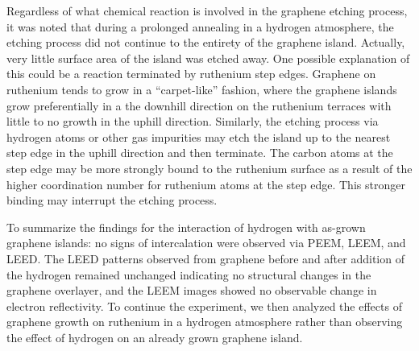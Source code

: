 Regardless of what chemical reaction is involved in the graphene etching process, it was noted that during a prolonged annealing in a hydrogen atmosphere, the etching process did not continue to the entirety of the graphene island. Actually, very little surface area of the island was etched away. One possible explanation of this could be a reaction terminated by ruthenium step edges.  Graphene on ruthenium tends to grow in a ``carpet-like'' fashion, where the graphene islands grow preferentially in a the downhill direction on the ruthenium terraces with little to no growth in the uphill direction. Similarly, the etching process via hydrogen atoms or other gas impurities may etch the island up to the nearest step edge in the uphill direction and then terminate. The carbon atoms at the step edge may be more strongly bound to the ruthenium surface as a result of the higher coordination number for ruthenium atoms at the step edge. This stronger binding may interrupt the etching process.

To summarize the findings for the interaction of hydrogen with as-grown graphene islands: no signs of intercalation were observed via PEEM, LEEM, and LEED. The LEED patterns observed from graphene before and after addition of the hydrogen remained unchanged indicating no structural changes in the graphene overlayer, and the LEEM images showed no observable change in electron reflectivity. To continue the experiment, we then analyzed the effects of graphene growth on ruthenium in a hydrogen atmosphere rather than observing the effect of hydrogen on an already grown graphene island.


